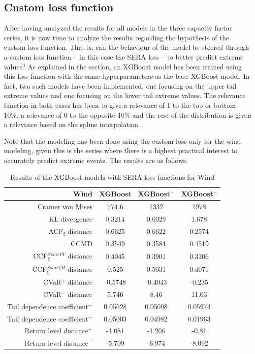 \subsection{Custom loss function}
After having analyzed the results for all models in the three capacity factor series, it is now time to analyze the results regarding the hypothesis of the custom loss function. That is, can the behaviour of the model be steered through a custom loss function -- in this case the SERA loss -- to better predict extreme values? As explained in the  section, an XGBoost model has been trained using this loss function with the same hyperparameters as the base XGBoost model. In fact, two such models have been implemented, one focusing on the upper tail extreme values and one focusing on the lower tail extreme values. The relevance function in both cases has been to give a relevance of 1 to the top or bottom 10\%, a relevance of 0 to the opposite 10\% and the rest of the distribution is given a relevance based on the spline interpolation. 

Note that the modeling has been done using the custom loss only for the wind modeling, given this is the series where there is a highest practical interest to accurately predict extreme events. The results are as follows. 

\newpage
\begin{table}[ht]
    \centering
    \footnotesize
    \begin{tabular}[r]{r|c|cc}
        \toprule
        \textbf{Wind}&XGBoost&XGBoost$^-$&XGBoost$^+$ \\
        \midrule            
        Cramer von Mises&774.6&1332&1978 \\
        KL divergence&0.3214&0.6029&1.678 \\
        ACF$_\xi$ distance&0.6625&0.6622&0.2574 \\
        \midrule
        CCMD&0.3549&0.3584&0.4519 \\
        CCF$_\xi^{Solar PV}$ distance&0.4045&0.3901&0.3306 \\
        CCF$_\xi^{Solar TH}$ distance&0.525&0.5031&0.4071 \\
        \midrule
        CVaR$^+$ distance&-0.5748&-0.4043&-0.235 \\
        CVaR$^-$ distance&5.746&8.46&11.03 \\
        Tail dependence coefficient$^+$&0.05028&0.05008&0.05974 \\
        Tail dependence coefficient$^-$&0.05003&0.04982&0.01963 \\
        Return level distance$^+$&-1.081&-1.206&-0.81 \\
        Return level distance$^-$&-5.709&-6.974&-8.092 \\
        \bottomrule
    \end{tabular}
    \caption{Results of the XGBoost models with SERA loss functions for Wind\label{long}}
    \label{table:results-custom-loss}
\end{table}

